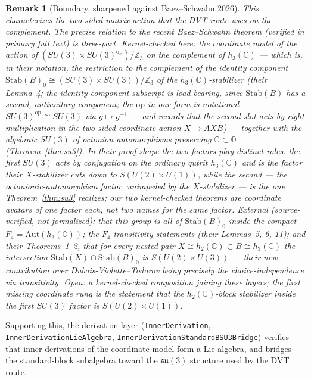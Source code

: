 \documentclass[11pt]{article}
\newcommand{\C}{\mathbb{C}}
\newcommand{\OO}{\mathbb{O}}
\newcommand{\su}{\mathfrak{su}}
\newcommand{\leanname}[1]{\texttt{#1}}
\newtheorem{remark}{Remark}
\begin{document}
\begin{remark}[Boundary, sharpened against Baez--Schwahn 2026]
This characterizes the \emph{two-sided matrix action} that the DVT route
uses on the complement.  The precise relation to the recent
Baez--Schwahn theorem \cite{BaezSchwahn2026} (verified in primary full
text) is three-part.  \emph{Kernel-checked here:} the coordinate model
of the action of $(SU(3)\times SU(3)^{\mathrm{op}})/\mathbb{Z}_3$ on the
complement of $h_3(\C)$ --- which is, in their notation, the restriction
to the complement of the identity component
$\mathrm{Stab}(B)_0 \cong (SU(3)\times SU(3))/\mathbb{Z}_3$ of the
$h_3(\C)$-stabilizer (their Lemma~4; the identity-component subscript is
load-bearing, since $\mathrm{Stab}(B)$ has a second, antiunitary
component; the $\mathrm{op}$ in our form is notational ---
$SU(3)^{\mathrm{op}} \cong SU(3)$ via $g \mapsto g^{-1}$ --- and records
that the second slot acts by right multiplication in the two-sided
coordinate action $X \mapsto AXB$) --- together with the algebraic
$SU(3)$ of octonion automorphisms preserving $\C\subset\OO$
(Theorem~\ref{thm:su3}).  In their proof shape the two factors play
distinct roles: the first $SU(3)$ acts by conjugation on the ordinary
qutrit $h_3(\C)$ and is the factor their $X$-stabilizer cuts down to
$S(U(2)\times U(1))$, while the second --- the octonionic-automorphism
factor, unimpeded by the $X$-stabilizer --- is the one
Theorem~\ref{thm:su3} realizes; our two kernel-checked theorems are
coordinate avatars of one factor each, not two names for the same
factor.  \emph{External
(source-verified, not formalized):} that this group is all of
$\mathrm{Stab}(B)_0$ inside the compact
$F_4 = \mathrm{Aut}(h_3(\OO))$; the $F_4$-transitivity statements
(their Lemmas~5, 6, 11); and their Theorems~1--2, that for every nested
pair $X \cong h_2(\C) \subset B \cong h_3(\C)$ the intersection
$\mathrm{Stab}(X)\cap\mathrm{Stab}(B)_0$ is $S(U(2)\times U(3))$ ---
their new contribution over Dubois-Violette--Todorov being precisely the
choice-independence via transitivity.  \emph{Open:} a kernel-checked
composition joining these layers; the first missing coordinate rung is
the statement that the $h_2(\C)$-block stabilizer inside the first
$SU(3)$ factor is $S(U(2)\times U(1))$.
\end{remark}

Supporting this, the derivation layer
(\leanname{InnerDerivation},
\leanname{InnerDerivationLieAlgebra},
\leanname{InnerDerivationStandardBSU3Bridge}) verifies that inner
derivations of the coordinate model form a Lie algebra, and bridges the
standard-block subalgebra toward the $\su(3)$ structure used by the DVT
route.
\end{document}
